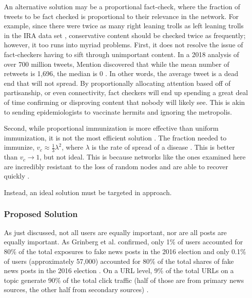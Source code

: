 \documentclass[preprint,review,12pt]{elsarticle}
\begin{document}
 An alternative solution may be a proportional fact-check, where the fraction of tweets to be fact checked is proportional to their relevance in the network. For example, since there were twice as many right leaning trolls as left leaning trolls in the IRA data set \cite{freelon2020black,badawy2018analyzing,benkler2018network}, conservative content should be checked twice as frequently; however, it too runs into myriad problems. First, it does not resolve the issue of fact-checkers having to sift through unimportant content. In a 2018 analysis of over 700 million tweets, Mention discovered that while the mean number of retweets is 1,696, the median is 0 \citep{mention2018twitter}. In other words, the average tweet is a dead end that will not spread. By proportionally allocating attention based off of partisanship, or even connectivity, fact checkers will end up spending a great deal of time confirming or disproving content that nobody will likely see. This is akin to sending epidemiologists to vaccinate hermits and ignoring the metropolis. 

Second, while proportional immunization is more effective than uniform immunization, it is not the most efficient solution \cite{dezsHo2002halting,anderson1992infectious}. The fraction needed to immunize, $v_c \approx \frac{1}{3}\lambda^2$, where $\lambda$ is the rate of spread of a disease \cite{pastor2002immunization,barabasi1999emergence}. This is better than $v_c \rightarrow 1$, but not ideal. This is because networks like the ones examined here are incredibly resistant to the loss of random nodes and are able to recover quickly \cite{cohen2001breakdown,callaway2000network,albert2000error}.

Instead, an ideal solution must be targeted in approach.
 
 
 
 \subsubsection{Proposed Solution}
 \label{sec: proposed solution}
 
 As just discussed, not all users are equally important, nor are all posts are equally important. As Grinberg et al. confirmed, only 1\% of users accounted for 80\% of the total exposures to fake news posts in the 2016 election and only 0.1\% of users (approximately 57,000) accounted for 80\% of the total shares of fake news posts in the 2016 election \cite{grinberg2019fake}.
 On a URL level, 9\% of the total URLs on a topic generate 90\% of the total click traffic (half of those are from primary news sources, the other half from secondary sources) \cite{gabielkov2016social}. 
 
\end{document}
